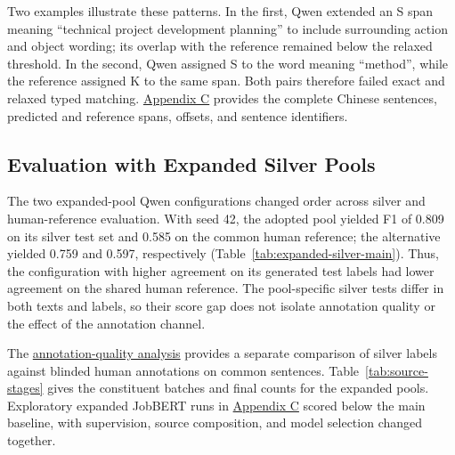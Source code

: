 Two examples illustrate these patterns. In the first, Qwen extended an S span meaning ``technical project development planning'' to include surrounding action and object wording; its overlap with the reference remained below the relaxed threshold. In the second, Qwen assigned S to the word meaning ``method'', while the reference assigned K to the same span. Both pairs therefore failed exact and relaxed typed matching. \hyperref[sec:error-examples]{Appendix C} provides the complete Chinese sentences, predicted and reference spans, offsets, and sentence identifiers.

\subsection{Evaluation with Expanded Silver Pools}
\label{sec:expanded-pool-results}

The two expanded-pool Qwen configurations changed order across silver and human-reference evaluation. With seed 42, the adopted pool yielded F1 of 0.809 on its silver test set and 0.585 on the common human reference; the alternative yielded 0.759 and 0.597, respectively (Table~\ref{tab:expanded-silver-main}). Thus, the configuration with higher agreement on its generated test labels had lower agreement on the shared human reference. The pool-specific silver tests differ in both texts and labels, so their score gap does not isolate annotation quality or the effect of the annotation channel.

The \hyperref[sec:annotation-quality]{annotation-quality analysis} provides a separate comparison of silver labels against blinded human annotations on common sentences. Table~\ref{tab:source-stages} gives the constituent batches and final counts for the expanded pools. Exploratory expanded JobBERT runs in \hyperref[app:c]{Appendix C} scored below the main baseline, with supervision, source composition, and model selection changed together.
